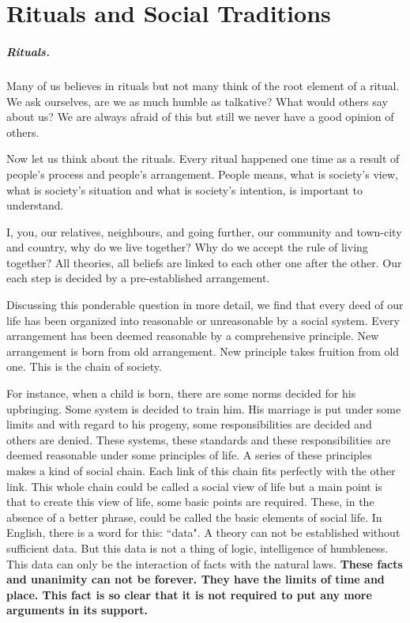 \chapter{Rituals and Social Traditions}
\paragraph{Rituals.} Many of us believes in rituals but not many think of the
root element of a ritual. We ask ourselves, are we as much humble as
talkative? What would others say about us? We are always afraid of this but
still we never have a good opinion of others.

Now let us think about the rituals. Every ritual happened one time as a result
of people's process and people's arrangement. People means, what is society's
view, what is society's situation and what is society's intention, is important
to understand.

I, you, our relatives, neighbours, and going further, our community and
town-city and country, why do we live together? Why do we accept the rule of
living together? All theories, all beliefs are linked to each other one after
the other. Our each step is decided by a pre-established arrangement.

Discussing this ponderable question in more detail, we find that every deed of
our life has been organized into reasonable or unreasonable by a social system.
Every arrangement has been deemed reasonable by a comprehensive principle. New
arrangement is born from old arrangement. New principle takes fruition from old
one. This is the chain of society. 

For instance, when a child is born, there are some norms decided for his
upbringing. Some system is decided to train him. His marriage is put under some
limits and with regard to his progeny, some responsibilities are decided and
others are denied. These systems, these standards and these responsibilities are
deemed reasonable under some principles of life. A series of these principles
makes a kind of social chain. Each link of this chain fits perfectly with the
other link. This whole chain could be called a social view of life but a main
point is that to create this view of life, some basic points are required.
These, in the absence of a better phrase, could be called the basic elements of
social life. In English, there is a word for this: ``data". A theory can not be
established without sufficient data. But this data is not a thing of logic,
intelligence of humbleness. This data can only be the interaction of facts with
the natural laws. \textbf{These facts and unanimity can not be forever. They
have the limits of time and place. This fact is so clear that it is not required
to put any more arguments in its support.}

